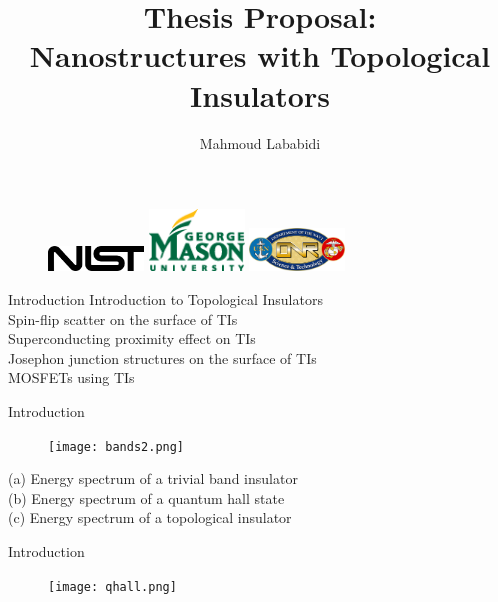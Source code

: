 \documentclass[]{beamer}
\title{Thesis Proposal: \\Nanostructures with Topological Insulators}
\author{Mahmoud Lababidi}
\begin{document}
\begin{frame}{}
\maketitle
\begin{figure}
\includegraphics[width=1in]{include/nist.png}\quad
\includegraphics[width=1in]{include/gmu.eps}\quad
\includegraphics[width=1in]{include/onr.jpg}
\end{figure}
\end{frame}

\begin{frame}{Introduction}
Introduction to Topological Insulators\\
Spin-flip scatter on the surface of TIs\\
Superconducting proximity effect on TIs\\
Josephon junction structures on the surface of TIs\\
MOSFETs using TIs\\

\end{frame}


\begin{frame}{Introduction}
\begin{figure}
\center
\texttt{[image: bands2.png]}

\end{figure}

(a) Energy spectrum of a trivial band insulator \\
(b)  Energy spectrum of a quantum hall state \\
(c)  Energy spectrum of a topological insulator \\

\end{frame}


\begin{frame}{Introduction}


\begin{figure}
\center
\texttt{[image: qhall.png]}

\end{figure}

\end{frame}
\end{document}
